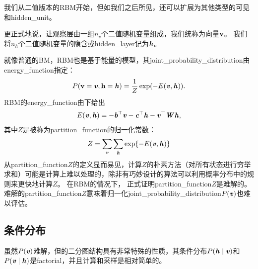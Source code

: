 
我们从二值版本的\gls{RBM}开始，但如我们之后所见，还可以扩展为其他类型的可见和\gls{hidden_unit}。

更正式地说，让观察层由一组$n_v$个二值随机变量组成，我们统称为向量$\mathbf{v}$。
我们将$n_h$个二值随机变量的隐含或\gls{hidden_layer}记为$\boldsymbol{\mathit{h}}$。

就像普通的\gls{BM}，\gls{RBM}也是基于能量的模型，其\gls{joint_probability_distribution}由\gls{energy_function}指定：
\begin{align}
 P(\mathbf{v} = \boldsymbol{\mathit{v}}, \mathbf{h} = \boldsymbol{\mathit{h}}) = \frac{1}{Z} \exp(-E(\boldsymbol{\mathit{v}}, \boldsymbol{\mathit{h}})).
\end{align}
RBM的\gls{energy_function}由下给出
\begin{align} \label{eq:205e}
 E(\boldsymbol{\mathit{v}}, \boldsymbol{\mathit{h}}) = -\boldsymbol{\mathit{b}}^\top \boldsymbol{\mathit{v}} - \boldsymbol{\mathit{c}}^\top \boldsymbol{\mathit{h}} - \boldsymbol{\mathit{v}}^\top \boldsymbol{\mathit{W}} \boldsymbol{\mathit{h}},
\end{align}
其中$Z$是被称为\gls{partition_function}的归一化常数：
\begin{align}
 Z = \sum_{\boldsymbol{\mathit{v}}} \sum_{\boldsymbol{\mathit{h}}} \exp \{-E(\boldsymbol{\mathit{v}}, \boldsymbol{\mathit{h}}) \}
\end{align}
从\gls{partition_function}$Z$的定义显而易见，计算$Z$的朴素方法（对所有状态进行穷举求和）可能是计算上难以处理的，除非有巧妙设计的算法可以利用概率分布中的规则来更快地计算$Z$。
在\gls{RBM}的情况下， \citet{long10rbm}正式证明\gls{partition_function}$Z$是难解的。
难解的\gls{partition_function}$Z$意味着归一化\gls{joint_probability_distribution}$P(\boldsymbol{\mathit{v}})$也难以评估。


\subsection{条件分布}
\label{sec:conditional_distributions_chap20}
虽然$P(\boldsymbol{\mathit{v}})$难解，但的二分图结构具有非常特殊的性质，其条件分布$P(\boldsymbol{\mathit{h}} \mid \boldsymbol{\mathit{v}})$和$P(\boldsymbol{\mathit{v}}\mid\boldsymbol{\mathit{h}})$是\gls{factorial}，并且计算和采样是相对简单的。


